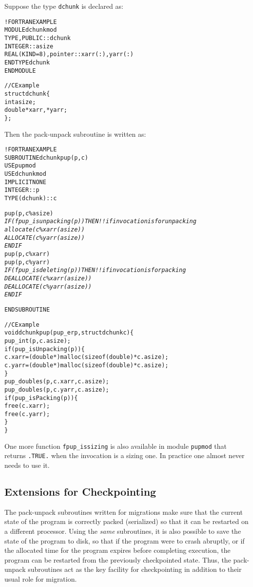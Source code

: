 \documentclass[10pt]{article}
\begin{document}
Suppose the type \texttt{dchunk} is declared as:

\begin{alltt}
!FORTRAN EXAMPLE
MODULE dchunkmod
  TYPE, PUBLIC :: dchunk
      INTEGER :: asize
      REAL(KIND=8), pointer :: xarr(:), yarr(:)
  END TYPE dchunk
END MODULE

//C Example
struct dchunk\{
  int asize;
  double* xarr, *yarr;
\};
\end{alltt}

Then the pack-unpack subroutine is written as:

\begin{alltt}
!FORTRAN EXAMPLE
SUBROUTINE dchunkpup(p, c)
  USE pupmod
  USE dchunkmod
  IMPLICIT NONE
  INTEGER :: p
  TYPE(dchunk) :: c

  pup(p, c\%asize)
  \emph{
  IF (fpup_isunpacking(p)) THEN       !! if invocation is for unpacking
    allocate(c\%xarr(asize))
    ALLOCATE(c\%yarr(asize))
  ENDIF
  }
  pup(p, c\%xarr)
  pup(p, c\%yarr)
  \emph{
  IF (fpup_isdeleting(p)) THEN        !! if invocation is for packing
    DEALLOCATE(c\%xarr(asize))
    DEALLOCATE(c\%yarr(asize))
  ENDIF
  }

END SUBROUTINE

//C Example
void dchunkpup(pup_er p, struct dchunk c)\{
  pup_int(p,c.asize);
  if(pup_isUnpacking(p))\{
    c.xarr = (double *)malloc(sizeof(double)*c.asize);
    c.yarr = (double *)malloc(sizeof(double)*c.asize);
  \}
  pup_doubles(p,c.xarr,c.asize);
  pup_doubles(p,c.yarr,c.asize);
  if(pup_isPacking(p))\{
    free(c.xarr);
    free(c.yarr);
  \}
\}
\end{alltt}

One more function \verb+fpup_issizing+ is also available in module \texttt{pupmod}
that returns \verb+.TRUE.+ when the invocation is a sizing one. In practice one
almost never needs to use it.

\subsection{Extensions for Checkpointing}

The pack-unpack subroutines written for migrations make sure that the current
state of the program is correctly packed (serialized) so that it can be
restarted on a different processor. Using the \emph{same} subroutines, it
is also possible to save the state of the program to disk, so that if the 
program were to crash abruptly, or if the allocated time for the program
expires before completing execution, the program can be restarted from the
previously checkpointed state. Thus, the pack-unpack subroutines act as the 
key facility for checkpointing in addition to their usual role for migration.
\end{document}
